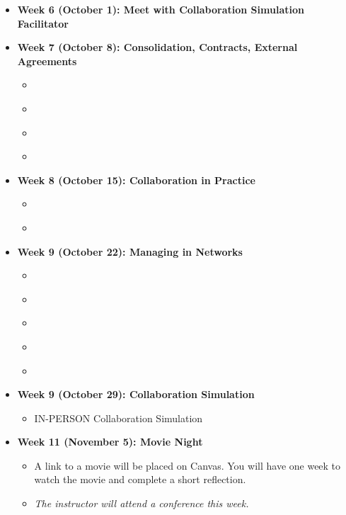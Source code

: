 \documentclass[12pt, letterpaper]{article}
\begin{document}
\begin{itemize}
	
	\item[] \textbf{Week 6 (October 1): Meet with Collaboration Simulation Facilitator}
		
	
	\item[] \textbf{Week 7 (October 8): Consolidation, Contracts, External Agreements}
		\begin{itemize}
			\item \citet[chaps.~4–5]{Agranoff2012}
			\item \citet[chaps.~4–6]{Henderson2015}
			\item  \citet[chap.~10]{Bingham2008}
			\item  \citet[chap.~7]{Feiock2010}
		\end{itemize}
	
	\item[] \textbf{Week 8 (October 15): Collaboration in Practice}
		\begin{itemize}
            \item \citet[chap.~6]{Henderson2015}
            \item \citet[chap.~6]{Agranoff2012}			
		\end{itemize}
		
	
	\item[] \textbf{Week 9 (October 22): Managing in Networks}
		\begin{itemize}
			\item \citet[chap.~6]{Agranoff2012}
			\item \citet[chap.~3]{Kickert1997}
			\item  \citet[chap.~1]{Goldsmith2009}
			\item  \citet[chap.~9]{Bingham2008}
			\item  \citet[chap.~8]{Agranoff2017}
		\end{itemize}

    \item[] \textbf{Week 9 (October 29): Collaboration Simulation}
        \begin{itemize}
            \item IN-PERSON Collaboration Simulation
        \end{itemize}
		
	
	\item[] \textbf{Week 11 (November 5): Movie Night}
		\begin{itemize}
			\item A link to a movie will be placed on Canvas. You will have one week to watch the movie and complete a short reflection.
			\item \emph{The instructor will attend a conference this week.}
		\end{itemize}
	

\end{itemize}
\end{document}
